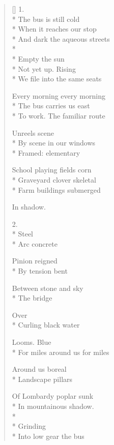 \label{ch:phoenix}
\settowidth{\versewidth}{                                         There---}
\begin{verse}[\versewidth]
1.\\*
The bus is still cold\\*
When it reaches our stop\\*
And dark          the aqueous streets\\*
 \\*
Empty      the sun\\*
Not yet up.           Rising\\*
We file into the same seats

Every morning           every morning\\*
The bus carries us east\\*
To work.    The familiar route

Unreels     scene\\*
By scene     in our windows\\*
Framed: elementary

School       playing fields     corn\\*
Graveyard      clover     skeletal\\*
Farm buildings submerged

In shadow.

2.\\*
                     Steel\\*
Arc              concrete

Pinion       reigned\\*
By tension           bent

Between stone and sky\\*
The bridge

                        Over\\*
Curling black water

Looms.                     Blue\\*
For miles around us          for miles

Around us         boreal\\*
Landscape       pillars

Of Lombardy poplar           sunk\\*
In mountainous               shadow.\\*
                                      \\*
                               Grinding\\*
Into low gear         the bus


\end{verse}
